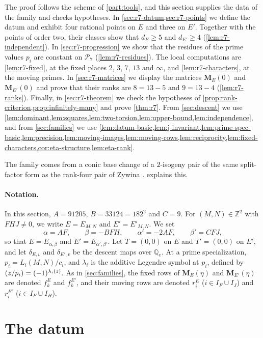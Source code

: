 \documentclass[12pt,oneside,openany]{book}
\theoremstyle{definition}
\theoremstyle{plain}
\numberwithin{equation}{chapter}
\theoremstyle{plain}
\theoremstyle{definition}
\theoremstyle{remark}
\newcommand{\Q}{\mathbb Q}
\newcommand{\Z}{\mathbb Z}
\newcommand{\leg}[2]{\mathchoice{\left(\frac{#1}{#2}\right)}{(#1/#2)}{(#1/#2)}{(#1/#2)}}
\newcommand{\cP}{\mathcal P}
\begin{document}
The proof follows the scheme of \cref{part:tools}, and this section supplies
the data of the family and checks hypotheses. In \cref{sec:r7-datum,sec:r7-points}
we define the datum and exhibit four rational points on $E$ and three on
$E'$. Together with the points of order two, their classes show that
$d_E\ge5$ and $d_{E'}\ge4$ (\cref{lem:r7-independent}). In
\cref{sec:r7-progression} we show that the residues of the prime values $p_i$
are constant on $\cP_7$ (\cref{lem:r7-residues}). The local computations
are \cref{lem:r7-fixed}, at the fixed places $2$, $3$, $7$, $13$ and
$\infty$, and \cref{lem:r7-characters}, at the moving primes. In
\cref{sec:r7-matrices} we display the matrices $\mathbf M_E(0)$ and
$\mathbf M_{E'}(0)$ and prove that their ranks are $8=13-5$ and $9=13-4$
(\cref{lem:r7-ranks}). Finally, in \cref{sec:r7-theorem} we check the
hypotheses of \cref{prop:rank-criterion,prop:infinitely-many} and prove
\cref{thm:r7}. From \cref{sec:descent} we use
\cref{lem:dominant,lem:squares,lem:two-torsion,lem:upper-bound,lem:independence},
and from \cref{sec:families} we use
\cref{lem:datum-basic,lem:j-invariant,lem:prime-spec-basic,lem:precision,lem:moving-images,lem:moving-rows,lem:reciprocity,lem:fixed-characters,cor:eta-structure,lem:eta-rank}.

The family comes from a conic base change of a $2$-isogeny pair of the same
split-factor form as the rank-four pair of Zywina
\cite[\S6.5]{Zywina2026}.  explains this.

\paragraph{Notation.}
In this section, $A=91205$, $B=33124=182^2$ and $C=9$. For $(M,N)\in\Z^2$
with $FHJ\ne0$, we write $E=E_{M,N}$ and $E'=E'_{M,N}$. We set
\[
 \alpha=AF,\qquad \beta=-BFH,\qquad \alpha'=-2AF,\qquad \beta'=CFJ,
\]
so that $E=E_{\alpha,\beta}$ and $E'=E_{\alpha',\beta'}$. Let
$T=(0,0)$ on $E$ and $T'=(0,0)$ on $E'$, and let $\delta_{E,v}$ and
$\delta_{E',v}$ be the descent maps over $\Q_v$. At a prime
specialization, $p_i=L_i(M,N)/c_i$, and $\lambda_i$ is the additive
Legendre symbol at $p_i$, defined by $\leg z{p_i}=(-1)^{\lambda_i(z)}$. As in
\cref{sec:families}, the fixed rows of $\mathbf M_E(\eta)$ and
$\mathbf M_{E'}(\eta)$ are denoted $f^E_k$ and $f^{E'}_k$, and their moving
rows are denoted $r^E_i$ ($i\in I_F\cup I_J$) and $r^{E'}_i$
($i\in I_F\cup I_H$).

\section{The datum}\label{sec:r7-datum}
\end{document}
